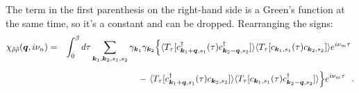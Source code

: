 \documentclass[a4j]{jsarticle}
\begin{document}
%
%
%
%
The term in the first parenthesis on the right-hand side is a Green's function at the same time, so it's a constant and can be dropped.
Rearranging the signs:
%
%
%
%
\begin{eqnarray}
	\chi_{\tilde{\rho} \tilde{\rho}}(\bm{q},i \nu_{n})
	&=&
	\int^{\beta}_{0} d \tau
	\sum_{\bm{k}_{1} , \bm{k}_{2} , s_{1} ,s_{2} }
	\gamma_{\bm{k}_{1}}
	\gamma_{\bm{k}_{2}}
	\Big\{
	\langle T_{\tau} [
			c_{ \bm{k}_{1}+\bm{q} , s_{1} }^{\dagger} (\tau)
			c_{ \bm{k}_{2}-\bm{q} , s_{2} }^{\dagger}
		] \rangle
	\langle T_{\tau} [
			c_{ \bm{k}_{1} , s_{1} } (\tau)
			c_{ \bm{k}_{2} , s_{2} }
		] \rangle
	e^{i \nu_{m} \tau}
	\nonumber \ \\[2mm]
	&& \hspace{25mm} - \
	\langle T_{\tau} [
			c_{ \bm{k}_{1}+\bm{q} , s_{1} }^{\dagger} (\tau)
			c_{ \bm{k}_{2} , s_{2} }
		] \rangle
	\langle T_{\tau} [
			c_{ \bm{k}_{1} , s_{1} } (\tau)
			c_{ \bm{k}_{2}-\bm{q} , s_{2} }^{\dagger}
		] \rangle
	\Big\}
	e^{i \nu_{m} \tau}
	\ \ .
	\label{eqn:timeintegralbefore141125}
\end{eqnarray}
%
%
%
%
\end{document}
